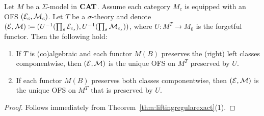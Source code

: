 \begin{corollary}
    Let $M$ be a $\Sigma$-model in $\mathbf{CAT}$. Assume each category $M_c$ is equipped with an OFS $(\mathcal{E}_c,\mathcal{M}_c)$. Let $T$ be a $\sigma$-theory and denote $(\mathcal{E},\mathcal{M}) \coloneqq (U^{-1}(\prod_s \mathcal{E}_{c_s}),U^{-1}(\prod_s \mathcal{M}_{c_s}))$, where $U\colon M^T\to M_0$ is the forgetful functor. Then the following hold:
    \begin{enumerate}
        \item If $T$ is (co)algebraic and each functor $M(B)$ preserves the (right) left classes componentwise, then $(\mathcal{E},\mathcal{M})$ is the unique OFS on $M^T$ preserved by $U$.
        \item If each functor $M(B)$ preserves both classes componentwise, then $(\mathcal{E},\mathcal{M})$ is the unique OFS on $M^T$ that is preserved by $U$.
    \end{enumerate}
\end{corollary}
\begin{proof}
    Follows immediately from Theorem~\ref{thm:liftingregularexact}(1).
\end{proof}

